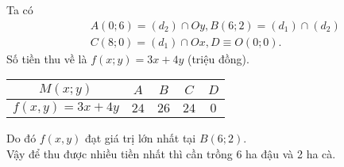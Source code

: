 \begin{vd}
{\begin{center}
		\end{center}
		Ta có 
		{\allowdisplaybreaks
			\begin{eqnarray*}
				&&A(0;6)=(d_2) \cap Oy,B(6;2)=(d_1) \cap (d_2)\\
				&&C(8;0)=(d_1) \cap Ox,D \equiv O(0;0).
			\end{eqnarray*}
		}
		Số tiền thu về là $f(x;y)=3x+4y$ (triệu đồng).
		\begin{center}
			\renewcommand\arraystretch{1.6}
			\renewcommand{\tabcolsep}{6mm}
			\begin{tabular}{|c|c|c|c|c|}
				\hline 
				$M(x;y)$& $A$ & $B$ & $C$ & $D$ \\ 
				\hline 
				$f(x,y)=3x+4y$& $24$ & $26$ & $24$ & $0$ \\ 
				\hline 
			\end{tabular} 
		\end{center}
		Do đó $f(x,y)$ đạt giá trị lớn nhất tại $B(6;2)$.\\
		Vậy để thu được nhiều tiền nhất thì cần trồng 6 ha đậu và 2 ha cà.
	}	
\end{vd}
\baitaptl
